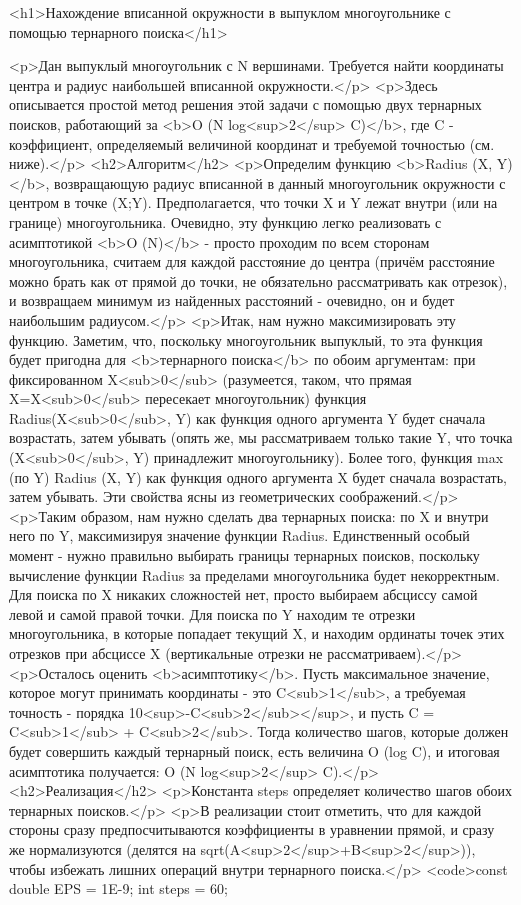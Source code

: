 <h1>Нахождение вписанной окружности в выпуклом многоугольнике с помощью тернарного поиска</h1>

<p>Дан выпуклый многоугольник с N вершинами. Требуется найти координаты центра и радиус наибольшей вписанной окружности.</p>
<p>Здесь описывается простой метод решения этой задачи с помощью двух тернарных поисков, работающий за <b>O (N log<sup>2</sup> C)</b>, где C - коэффициент, определяемый величиной координат и требуемой точностью (см. ниже).</p>
<h2>Алгоритм</h2>
<p>Определим функцию <b>Radius (X, Y)</b>, возвращающую радиус вписанной в данный многоугольник окружности с центром в точке (X;Y). Предполагается, что точки X и Y лежат внутри (или на границе) многоугольника. Очевидно, эту функцию легко реализовать с асимптотикой <b>O (N)</b> - просто проходим по всем сторонам многоугольника, считаем для каждой расстояние до центра (причём расстояние можно брать как от прямой до точки, не обязательно рассматривать как отрезок), и возвращаем минимум из найденных расстояний - очевидно, он и будет наибольшим радиусом.</p>
<p>Итак, нам нужно максимизировать эту функцию. Заметим, что, поскольку многоугольник выпуклый, то эта функция будет пригодна для <b>тернарного поиска</b> по обоим аргументам: при фиксированном X<sub>0</sub> (разумеется, таком, что прямая X=X<sub>0</sub> пересекает многоугольник) функция Radius(X<sub>0</sub>, Y) как функция одного аргумента Y будет сначала возрастать, затем убывать (опять же, мы рассматриваем только такие Y, что точка (X<sub>0</sub>, Y) принадлежит многоугольнику). Более того, функция max (по Y) { Radius (X, Y) } как функция одного аргумента X будет сначала возрастать, затем убывать. Эти свойства ясны из геометрических соображений.</p>
<p>Таким образом, нам нужно сделать два тернарных поиска: по X и внутри него по Y, максимизируя значение функции Radius. Единственный особый момент - нужно правильно выбирать границы тернарных поисков, поскольку вычисление функции Radius за пределами многоугольника будет некорректным. Для поиска по X никаких сложностей нет, просто выбираем абсциссу самой левой и самой правой точки. Для поиска по Y находим те отрезки многоугольника, в которые попадает текущий X, и находим ординаты точек этих отрезков при абсциссе X (вертикальные отрезки не рассматриваем).</p>
<p>Осталось оценить <b>асимптотику</b>. Пусть максимальное значение, которое могут принимать координаты - это C<sub>1</sub>, а требуемая точность - порядка 10<sup>-C<sub>2</sub></sup>, и пусть C = C<sub>1</sub> + C<sub>2</sub>. Тогда количество шагов, которые должен будет совершить каждый тернарный поиск, есть величина O (log C), и итоговая асимптотика получается: O (N log<sup>2</sup> C).</p>
<h2>Реализация</h2>
<p>Константа steps определяет количество шагов обоих тернарных поисков.</p>
<p>В реализации стоит отметить, что для каждой стороны сразу предпосчитываются коэффициенты в уравнении прямой, и сразу же нормализуются (делятся на sqrt(A<sup>2</sup>+B<sup>2</sup>)), чтобы избежать лишних операций внутри тернарного поиска.</p>
<code>const double EPS = 1E-9;
int steps = 60;

